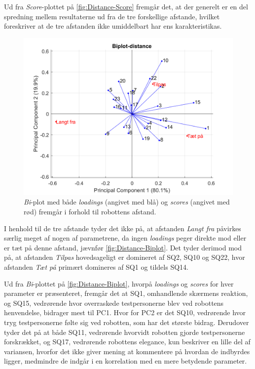 \noindent
%
Ud fra \textit{Score}-plottet på \autoref{fig:Distance-Score} fremgår det, at der generelt er en del spredning mellem resultaterne ud fra de tre forskellige afstande, hvilket foreskriver at de tre afstanden ikke umiddelbart har ens karakteristikas. 
%
\begin{figure}[H]
\centering
\includegraphics[width=\textwidth]{Figure/DatabehandlingSkalaer/PCAfigures/Distance-Biplot.png}
\caption{\textit{Bi}-plot med både \textit{loadings} (angivet med blå) og \textit{scores} (angivet med rød) fremgår i forhold til robottens afstand.}
\label{fig:Distance-Biplot}
\end{figure}
\noindent
%
I henhold til de tre afstande tyder det ikke på, at afstanden \textit{Langt fra} påvirkes særlig meget af nogen af parametrene, da ingen \textit{loadings} peger direkte mod eller er tæt på denne afstand, jævnfør \autoref{fig:Distance-Biplot}. Det tyder derimod mod på, at afstanden \textit{Tilpas} hovedsageligt er domineret af SQ2, SQ10 og SQ22, hvor afstanden \textit{Tæt på} primært domineres af SQ1 og tildels SQ14.     

Ud fra \textit{Bi}-plottet på \autoref{fig:Distance-Biplot}, hvorpå \textit{loadings} og \textit{scores} for hver parameter er præsenteret, fremgår det at SQ1, omhandlende skærmens reaktion, og SQ15, vedrørende hvor overraskede testpersonerne blev ved robottens henvendelse, bidrager mest til PC1. Hvor for PC2 er det SQ10, vedrørende hvor tryg testpersonerne følte sig ved robotten, som har det største bidrag. Derudover tyder det på at både SQ11, vedrørende hvorvidt robotten gjorde testpersonerne forskrækket, og SQ17, vedrørende robottens elegance, kun beskriver en lille del af variansen, hvorfor det ikke giver mening at kommentere på hvordan de indbyrdes ligger, medmindre de indgår i en korrelation med en mere betydende parameter.  

